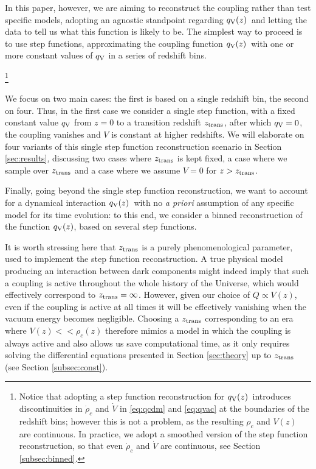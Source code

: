 \documentclass[a4paper,fleqn,usenatbib]{mnras}
\newcommand*{\qv}{$q_{\rm V}(z)$}
\begin{document}
In this paper, however, we are aiming to reconstruct the coupling rather than test specific models, adopting an agnostic standpoint regarding \qv\ and letting the data to tell us what this function is likely to be.  The simplest way to  proceed is to use step functions, approximating the coupling function \qv\ with one or more constant values of $q_{\rm V}$ in a series of redshift bins.

\footnote{Notice that adopting a step function reconstruction for \qv\ introduces  discontinuities in $\dot{\rho}_c$ and $\dot{V}$ in \eqref{eq:qcdm} and \eqref{eq:qvac} at the boundaries of the redshift bins; however this is not a problem, as the resulting $\rho_c$ and $V(z)$ are continuous. In practice, we adopt a smoothed version of the step function reconstruction, so that even $\dot{\rho}_c$ and $\dot{V}$ are continuous, see Section \ref{subsec:binned}.}

We focus on two main cases: the first is based on a single redshift bin, the second on four. Thus, in the first case  we consider a single step function, with  a fixed constant value $q_{\rm V}$ from $z=0$  to a transition redshift $z_{\rm trans}$, after which  $q_{\rm V}=0$, the coupling  vanishes and $V$ is constant at higher redshifts. We will elaborate on four variants of this single step function reconstruction scenario in Section \ref{sec:results}, discussing two cases where $z_{\rm trans}$ is kept fixed, a case where we sample over $z_{\rm trans}$ and a case where we assume $V=0$ for $z > z_{\rm trans}$.

Finally, going beyond the single step function reconstruction, we  want to account for a dynamical  interaction \qv\ with no {\it a priori} assumption of any specific model for its time evolution: to this end, we consider a binned reconstruction of the function \qv, based on several step functions.

It is worth stressing here that $z_{\rm trans}$ is a purely phenomenological parameter, used to implement the step function reconstruction. A true physical model producing an interaction between dark components might indeed imply that such a coupling is active throughout the whole history of the Universe, which would effectively correspond to $z_{\rm trans}=\infty$. However, given our choice of $Q\propto V(z)$, even if the coupling is active at all times it will be effectively vanishing when the vacuum energy becomes negligible. Choosing a $z_{\rm trans}$ corresponding to an era where $V(z)<<\rho_c(z)$ therefore mimics a model in which the coupling is always active and also allows us save computational time, as it only requires solving the differential equations presented in Section \ref{sec:theory} up to $z_{\rm trans}$ (see Section \ref{subsec:const}).
\end{document}
